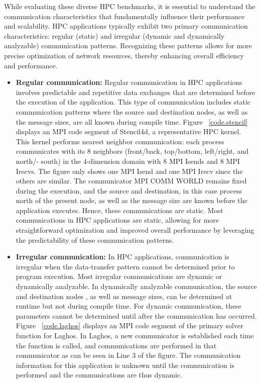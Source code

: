 While evaluating these diverse HPC benchmarks, it is essential to understand the communication characteristics that fundamentally influence their performance and scalability. HPC applications typically exhibit two primary communication characteristics: regular (static) and irregular (dynamic and dynamically analyzable) communication patterns. Recognizing these patterns allows for more precise optimization of network resources, thereby enhancing overall efficiency and performance.

\begin{itemize}
\item \textbf{Regular communication:} Regular communication in HPC applications involves predictable and repetitive data exchanges that are determined before the execution of the application. This type of communication includes static communication patterns where the source and destination nodes, as well as the message sizes, are all known during compile time. Figure ~\ref{code.stencil} displays an MPI code segment of Stencil4d, a representative HPC kernel.
This kernel performs nearest neighbor communication: each process communicates with its 8 neighbors (front/back, top/bottom, left/right, and north/- south) in the 4-dimension domain with 8 MPI Isends and 8 MPI Irecvs. The figure only shows one MPI Isend and one MPI Irecv since the others are similar. The communicator MPI COMM WORLD remains fixed during the execution, and the source and destination, in this case process north of the present node, as well as the message size are known before the application executes. Hence, these communications are static. 
Most communications in HPC applications are static, allowing for more straightforward optimization and improved overall performance by leveraging the predictability of these communication patterns.

\item \textbf{Irregular communication:} 
In HPC applications, communication is irregular when the data-transfer pattern cannot be determined prior to program execution. Most irregular communications are dynamic or dynamically analyzable.
In dynamically analyzable communication, the source and destination nodes
, as well as message sizes, can be determined at runtime but not 
during compile time. For dynamic communication, these parameters cannot be determined 
until after the communication has occurred. Figure ~\ref{code.laghos} displays an MPI code segment of the primary solver function for Laghos. In Laghos, a new communicator is established each time the function is called, and communications are performed in that communicator as can be seen in Line 3 of the figure. The communication information for this application is unknown until the communication is performed and the communications are thus dynamic.

\end{itemize}

